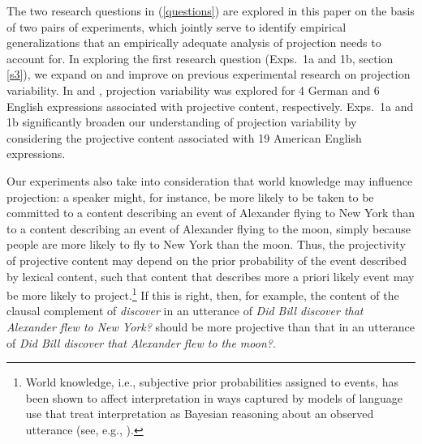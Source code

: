 \documentclass[11pt,fleqn]{article}
\newcommand{\6}{\mbox{$[\hspace*{-.6mm}[$}}
\newcommand{\9}{\mbox{$]\hspace*{-.6mm}]$}}
\begin{document}
The two research questions in (\ref{questions}) are explored in this paper on the basis of two pairs of experiments, which jointly serve to identify empirical generalizations that an empirically adequate analysis of projection needs to account for. In exploring the first research question (Exps.~1a and 1b, section \ref{s3}), we expand on and improve on previous experimental research on projection variability. In \citealt{xue-onea11} and \citealt{smith-hall11}, projection variability was explored for 4 German and 6 English expressions associated with projective content, respectively. Exps.~1a and 1b significantly broaden our understanding of projection variability by considering the projective content associated with 19 American English expressions. 

Our experiments also take into consideration that world knowledge may influence projection: a speaker might, for instance, be more likely to be taken to be committed to a content describing an event of Alexander flying to New York than to a content describing an event of Alexander flying to the moon, simply because people are more likely to fly to New York than the moon. Thus, the projectivity of projective content may depend on the prior probability of the event described by lexical content, such that content that describes more a priori likely event may be more likely to project.\footnote{World knowledge, i.e., subjective prior probabilities assigned to events, has been shown to affect interpretation in ways captured by models of language use that treat interpretation as Bayesian reasoning about an observed utterance (see, e.g., \citealt{frankejaeger2016, goodmanfrank2016}).} If this is right, then, for example, the content of the clausal complement of {\em discover} in an utterance of {\em Did Bill discover that Alexander flew to New York?} should be more projective than that in an utterance of {\em Did Bill discover that Alexander flew to the moon?}. 
\end{document}
